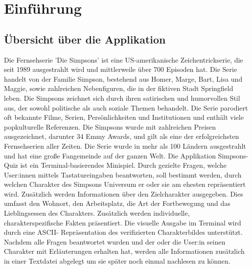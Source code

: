 \chapter{Einführung}

\section{Übersicht über die Applikation}
Die Fernsehserie 'Die Simpsons' ist eine US-amerikanische Zeichentrickserie, die seit 1989 ausgestrahlt wird und mittlerweile über 700 Episoden hat. Die Serie handelt von der Familie Simpson, bestehend aus Homer, Marge, Bart, Lisa und Maggie, sowie zahlreichen Nebenfiguren, die in der fiktiven Stadt Springfield leben. Die Simpsons zeichnet sich durch ihren satirischen und humorvollen Stil aus, der sowohl politische als auch soziale Themen behandelt. Die Serie parodiert oft bekannte Filme, Serien, Persönlichkeiten und Institutionen und enthält viele popkulturelle Referenzen. Die Simpsons wurde mit zahlreichen Preisen ausgezeichnet, darunter 34 Emmy Awards, und gilt als eine der erfolgreichsten Fernsehserien aller Zeiten. Die Serie wurde in mehr als 100 Ländern ausgestrahlt und hat eine große Fangemeinde auf der ganzen Welt.\cite{simpsons.2023}
\newline
Die Applikation Simpsons-Quiz ist ein Terminal-basierendes Minispiel. Durch gezielte Fragen, welche User:innen mittels Tastatureingaben beantworten, soll bestimmt werden, durch welchen Charakter des Simpsons Universum er oder sie am ehesten repräsentiert wird. Zusätzlich werden Informationen über den Zielcharakter ausgegeben. Dies umfasst den Wohnort, den Arbeitsplatz, die Art der Fortbewegung und das Lieblingsessen des Charakters. Zusätzlich werden individuelle, charakterspezifische Fakten präsentiert. \newline
Die visuelle Ausgabe im Terminal wird durch eine \ac{ASCII}- Repräsentation des verifizierten Charakterbildes unterstützt. Nachdem alle Fragen beantwortet wurden und der oder die User:in seinen Charakter mit Erläuterungen erhalten hat, werden alle Informationen zusätzlich in einer Textdatei abgelegt um sie später noch einmal nachlesen zu können.
\newpage
